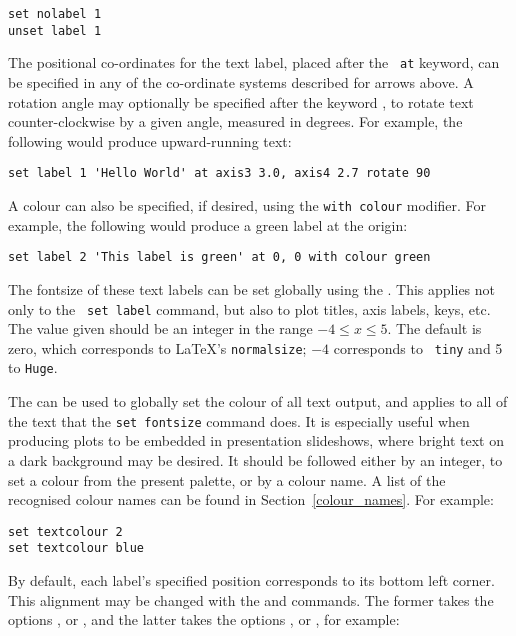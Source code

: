 \begin{verbatim}
set nolabel 1
unset label 1
\end{verbatim}

\noindent The positional co-ordinates for the text label, placed after the {\tt
at} keyword, can be specified in any of the co-ordinate systems described for
arrows above. A rotation angle may optionally be specified after the keyword
, to rotate text counter-clockwise by a given angle, measured
in degrees. For example, the following would produce upward-running text:

\begin{verbatim}
set label 1 'Hello World' at axis3 3.0, axis4 2.7 rotate 90
\end{verbatim}

A colour can also be specified, if desired, using the {\tt with colour}
modifier.  For example, the following would produce a green label at the origin:

\begin{verbatim}
set label 2 'This label is green' at 0, 0 with colour green
\end{verbatim}

 The fontsize of these text labels can be set
globally using the . This applies not only to the {\tt
set label} command, but also to plot titles, axis labels, keys, etc. The value
given should be an integer in the range $-4 \leq x \leq 5$. The default is
zero, which corresponds to \LaTeX's {\tt normalsize}; $-4$ corresponds to {\tt
tiny} and 5 to {\tt Huge}.

 The  can be
used to globally set the colour of all text output, and applies to all of the
text that the {\tt set fontsize} command does. It is especially useful when
producing plots to be embedded in presentation slideshows, where bright text on
a dark background may be desired. It should be followed either by an integer,
to set a colour from the present palette, or by a colour name. A list of the
recognised colour names can be found in Section~\ref{colour_names}.  For
example:

\begin{verbatim}
set textcolour 2
set textcolour blue
\end{verbatim}

By default, each label's specified
position corresponds to its bottom left corner. This alignment may be changed
with the  and  commands. The
former takes the options ,  or ,
and the latter takes the options ,  or
, for example:

